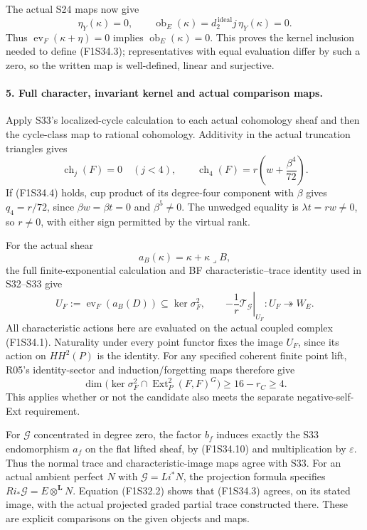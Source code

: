 The actual S24 maps now give
\[
 \eta_Y(\kappa)=0,\qquad
 \operatorname{ob}_E(\kappa)
                  =d_2^{\,\mathrm{ideal}}j\,\eta_Y(\kappa)=0.
 \tag{F1S34.21}
\]
Thus
$\operatorname{ev}_F(\kappa+\eta)=0$
implies $\operatorname{ob}_E(\kappa)=0$.
This proves the kernel inclusion needed to
define (F1S34.3); representatives with equal
evaluation differ by such a zero, so the
written map is well-defined, linear and
surjective.

\paragraph{5. Full character, invariant kernel and actual comparison maps.}
Apply S33's localized-cycle calculation to
each actual cohomology sheaf and then the
cycle-class map to rational cohomology.
Additivity in the actual truncation triangles
gives
\[
 \operatorname{ch}_j(F)=0\quad(j<4),\qquad
 \operatorname{ch}_4(F)
       =r\left(w+\frac{\beta^4}{72}\right).
 \tag{F1S34.22}
\]
If (F1S34.4) holds, cup product of its
degree-four component with $\beta$ gives
$q_4=r/72$, since $\beta w=\beta t=0$
and $\beta^5\ne0$.
The unwedged equality is $\lambda t=rw\ne0$,
so $r\ne0$, with either sign permitted by
the virtual rank.

For the actual shear
\[
 a_B(\kappa)=\kappa+\kappa\mathbin{\lrcorner}B,
\]
the full finite-exponential calculation and
BF characteristic--trace identity used in
S32--S33 give
\[
 U_F:=\operatorname{ev}_F(a_B(D))
                    \subseteq\ker\sigma_F^2,\qquad
 \left.-\frac1r\mathcal T_{\mathcal G}\right|_{U_F}:
                   U_F\twoheadrightarrow W_E.
 \tag{F1S34.23}
\]
All characteristic actions here are evaluated
on the actual coupled complex (F1S34.1).
Naturality under every point functor fixes
the image $U_F$, since its action on
$HH^2(P)$ is the identity.
For any specified coherent finite point lift,
R05's identity-sector and induction/forgetting
maps therefore give
\[
 \dim\bigl(\ker\sigma_F^2
          \cap\operatorname{Ext}^2_P(F,F)^G\bigr)
                         \ge16-r_C\ge4.
 \tag{F1S34.24}
\]
This applies whether or not the candidate
also meets the separate negative-self-Ext
requirement.

For $\mathcal G$ concentrated in degree zero,
the factor $b_f$ induces exactly the
S33 endomorphism $a_f$ on the flat lifted
sheaf, by (F1S34.10) and multiplication by
$\varepsilon$. Thus the normal trace and
characteristic-image maps agree with S33.
For an actual ambient perfect $N$ with
$\mathcal G=Li^*N$, the projection formula
specifies
$Ri_*\mathcal G=E\otimes^{\mathbf L}N$.
Equation (F1S32.2) shows that
(F1S34.3) agrees, on its stated image,
with the actual projected graded partial
trace constructed there.
These are explicit comparisons on the given
objects and maps.

